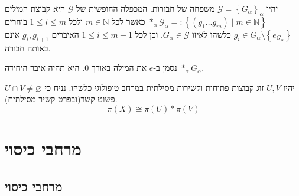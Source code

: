\documentclass{tstextbook}
\begin{document}
\begin{definition}
יהיו \(\mathcal{G}=\left\{  G_{\alpha}  \right\}_{\alpha}\) משפחה של חבורות. המכפלה החופשית של \(\mathcal{G}\) היא קבוצת המילים \(*_{\alpha}\mathcal{G}_{\alpha}=: \left\{  \left( g_{1}\dots g_{m} \right)\mid m \in \mathbb{N}  \right\}\) כאשר לכל \(m \in \mathbb{N}\) ולכל \(1\leq i\leq m\) בוחרים \(g_{i}\in G_{\alpha}\setminus \left\{  e_{G_{\alpha}}  \right\}\) כלשהו לאיזו \(G_{\alpha}\in \mathcal{G}\). וכן לכל \(1\leq i \leq m-1\) האיברים \(g_{i},g_{i+1}\) אינם באותה חבורה.

\end{definition}
\begin{symbolize}
נסמן ב-\(e\) את המילה באורך 0. היא תהיה איבר היחידה \(*_{\alpha}G_{\alpha}\). 

\end{symbolize}
\begin{theorem}
יהיו \(U,V\) זוג קבוצות פתוחות וקשירות מסילתית במרחב טופולוגי כלשהו. נניח כי \(U\cap V\neq \varnothing\) פשוט קשר(ובפרט קשיר מסילתית).
$$\pi(X)\cong \pi(U)*\pi(V)$$

\end{theorem}
\chapter{מרחבי כיסוי}

\section{מרחבי כיסוי}
\end{document}
